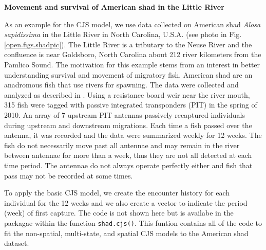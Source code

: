 {\flushleft \bf Movement and survival of American shad in the Little River}

As an example for the CJS model, we use data collected on
American shad \textit{Alosa sapidissima} in the Little River in North
Carolina, U.S.A. (see photo in Fig. \ref{open.figs.shadpic}).  The Little River is
a tributary to the Neuse River and the confluence is near Goldsboro, North Carolina
about 212 river kilometers from the Pamlico Sound.
The motivation for this example stems
from an interest in better understanding survival and movement of
migratory fish.  American shad are an anadromous fish that use rivers for
spawning.
 The
data were collected and analyzed as described in \citet{raabe_diss:2012}.  Using a
resistance board weir near the river mouth, 315 fish were tagged with
passive integrated transponders (PIT) in the spring of 2010. An array
of 7 upstream PIT antennas passively recaptured individuals during
upstream and downstream migrations.  Each time a fish passed over the
antenna, it was recorded and the data were summarized weekly for 12 weeks. 
The fish
do not necessarily move past all antennae and may remain in the river
between antennae for more than a week, thus they are not all detected
at each time period.  The antennae do not always operate perfectly
either and fish that pass may not be recorded at some times.

To apply the basic CJS model, we create the
encounter history for each individual for the 12 weeks and we also create
a vector to indicate the period (week) of first capture. The code is not shown here
 but is availabe in the \scrbook~ packagae within the function \verb+shad.cjs()+.  This funtion
 contains all of the code to fit the non-spatial, multi-state, and spatial CJS models
 to the American shad dataset.

